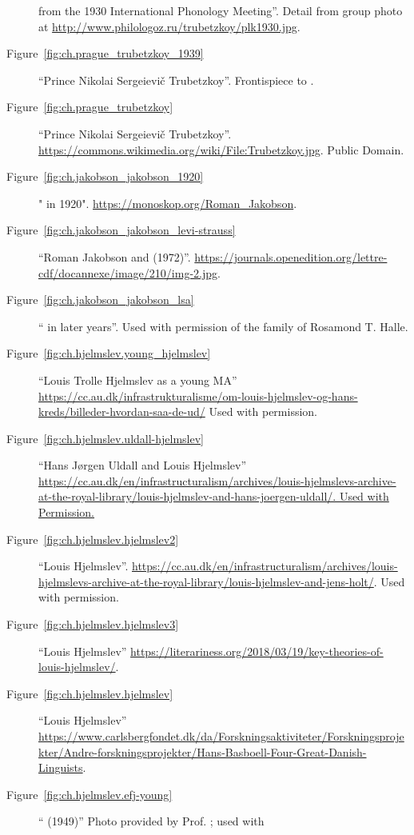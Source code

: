 \begin{description}
  from the 1930 International Phonology Meeting''. Detail from group
  photo at \url{http://www.philologoz.ru/trubetzkoy/plk1930.jpg}.
\item[Figure~\ref{fig:ch.prague_trubetzkoy_1939}] ``Prince Nikolai
  Sergeievič Trubetzkoy''. Frontispiece to
  \citealt{trubetzkoy39:grundzuge}.
\item[Figure~\ref{fig:ch.prague_trubetzkoy}] ``Prince Nikolai
  Sergeievič Trubetzkoy''.
  \url{https://commons.wikimedia.org/wiki/File:Trubetzkoy.jpg}. Public Domain.
\item[Figure~\ref{fig:ch.jakobson_jakobson_1920}]  " in
  1920".  \url{https://monoskop.org/Roman_Jakobson}.
\item[Figure~\ref{fig:ch.jakobson_jakobson_levi-strauss}] ``Roman
  Jakobson and  (1972)''. 
  \url{https://journals.openedition.org/lettre-cdf/docannexe/image/210/img-2.jpg}. 
\item[Figure~\ref{fig:ch.jakobson_jakobson_lsa}] `` in
later years''. Used with permission of the family of Rosamond
T. Halle.
\item[Figure~\ref{fig:ch.hjelmslev.young_hjelmslev}] ``Louis Trolle
  Hjelmslev as a young MA''
  \url{https://cc.au.dk/infrastrukturalisme/om-louis-hjelmslev-og-hans-kreds/billeder-hvordan-saa-de-ud/}
  Used with permission.
\item[Figure~\ref{fig:ch.hjelmslev.uldall-hjelmslev}] ``Hans Jørgen
  Uldall and Louis Hjelmslev''
  \url{https://cc.au.dk/en/infrastructuralism/archives/louis-hjelmslevs-archive-at-the-royal-library/louis-hjelmslev-and-hans-joergen-uldall/. Used
  with Permission.}
\item[Figure~\ref{fig:ch.hjelmslev.hjelmslev2}] ``Louis
  Hjelmslev''. \url{https://cc.au.dk/en/infrastructuralism/archives/louis-hjelmslevs-archive-at-the-royal-library/louis-hjelmslev-and-jens-holt/}. Used
  with permission.
\item[Figure~\ref{fig:ch.hjelmslev.hjelmslev3}] ``Louis Hjelmslev''
  \url{https://literariness.org/2018/03/19/key-theories-of-louis-hjelmslev/}. 
\item[Figure~\ref{fig:ch.hjelmslev.hjelmslev}] ``Louis Hjelmslev''
  \url{https://www.carlsbergfondet.dk/da/Forskningsaktiviteter/Forskningsprojekter/Andre-forskningsprojekter/Hans-Basboell-Four-Great-Danish-Linguists}.
\item[Figure~\ref{fig:ch.hjelmslev.efj-young}] ``
  (1949)'' Photo provided by Prof. ; used with

\end{description}
